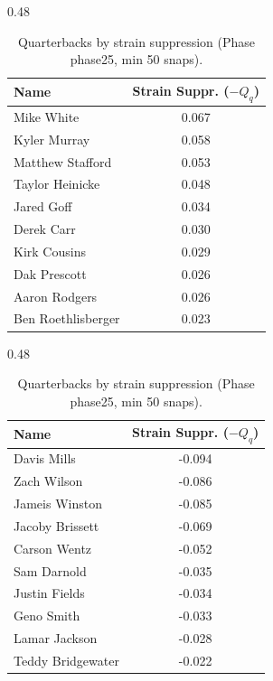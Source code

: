 \begin{table}[h!]
\centering
\begin{subtable}{0.48\textwidth}
\centering
\footnotesize
\begin{tabular}{lc}
\toprule
Name & Strain Suppr. ($-Q_q$) \\
\midrule
Mike White & 0.067 \\
Kyler Murray & 0.058 \\
Matthew Stafford & 0.053 \\
Taylor Heinicke & 0.048 \\
Jared Goff & 0.034 \\
Derek Carr & 0.030 \\
Kirk Cousins & 0.029 \\
Dak Prescott & 0.026 \\
Aaron Rodgers & 0.026 \\
Ben Roethlisberger & 0.023 \\
\bottomrule
\end{tabular}
\caption{Most strain-suppressing}
\end{subtable}
\hfill
\begin{subtable}{0.48\textwidth}
\centering
\footnotesize
\begin{tabular}{lc}
\toprule
Name & Strain Suppr. ($-Q_q$) \\
\midrule
Davis Mills & -0.094 \\
Zach Wilson & -0.086 \\
Jameis Winston & -0.085 \\
Jacoby Brissett & -0.069 \\
Carson Wentz & -0.052 \\
Sam Darnold & -0.035 \\
Justin Fields & -0.034 \\
Geno Smith & -0.033 \\
Lamar Jackson & -0.028 \\
Teddy Bridgewater & -0.022 \\
\bottomrule
\end{tabular}
\caption{Least strain-suppressing}
\end{subtable}
\hfill
\caption{Quarterbacks by strain suppression (Phase phase25, min 50 snaps).}
\label{tab:qb_supp_phase25}
\end{table}
